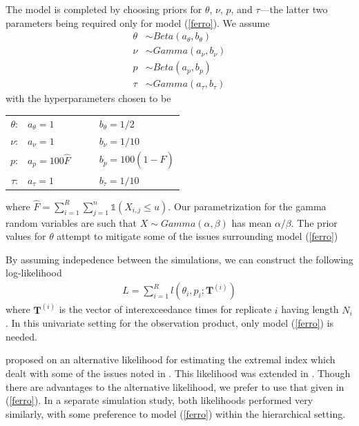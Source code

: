 \documentclass[12pt]{article}
\newcommand{\m}[1]{\mathbf{\bm{#1}}}
\newcommand{\ind}{\mathds{1}}
\begin{document}
The model is completed by choosing priors for $\theta$, $\nu$, $p$, and $\tau$---the latter two parameters being required only for model (\ref{ferro}). We assume
\begin{align*}
\theta &\sim Beta(a_\theta, b_\theta) \\
\nu &\sim Gamma(a_\nu, b_\nu) \\
p &\sim Beta(a_p, b_p) \\
\tau &\sim Gamma(a_\tau, b_\tau) 
\end{align*}
with the hyperparameters chosen to be
\begin{center}
\begin{tabular}{rlcl}
$\theta$: & $a_\theta = 1          $ &~~& $b_\theta = 1/2             $ \\
$   \nu$: & $   a_\nu = 1          $ &~~& $   b_\nu = 1/10            $ \\
$     p$: & $     a_p = 100 \hat{F}$ &~~& $     b_p = 100 (1-\hat{F}) $ \\
$  \tau$: & $  a_\tau = 1          $ &~~& $  b_\tau = 1/10            $ \\
\end{tabular}
\end{center}
where $\hat{F}=\sum_{i=1}^R\sum_{j=1}^n \ind(X_{i,j}\leq u)$. Our parametrization for the gamma random variables are such that $X\sim Gamma(\alpha,\beta)$ has mean $\alpha/\beta$. The prior values for $\theta$ attempt to mitigate some of the issues surrounding model (\ref{ferro})

By assuming indepedence between the simulations, we can construct the following log-likelihood
\begin{align}
L = \sum_{i=1}^R l(\theta_i, p_i; \m{T}^{(i)}) \label{hiertheta}
\end{align}
where $\m{T}^{(i)}$ is the vector of interexceedance times for replicate $i$ having length $N_i$. In this univariate setting for the observation product, only model (\ref{ferro}) is needed.

\cite{suveges2007likelihood} proposed on an alternative likelihood for estimating the extremal index which dealt with some of the issues noted in \cite{ferro2003inference}. This likelihood was extended in \cite{suveges2010model}. Though there are advantages to the alternative likelihood, we prefer to use that given in (\ref{ferro}). In a separate simulation study, both likelihoods performed very similarly, with some preference to model (\ref{ferro}) within the hierarchical setting.
\end{document}
